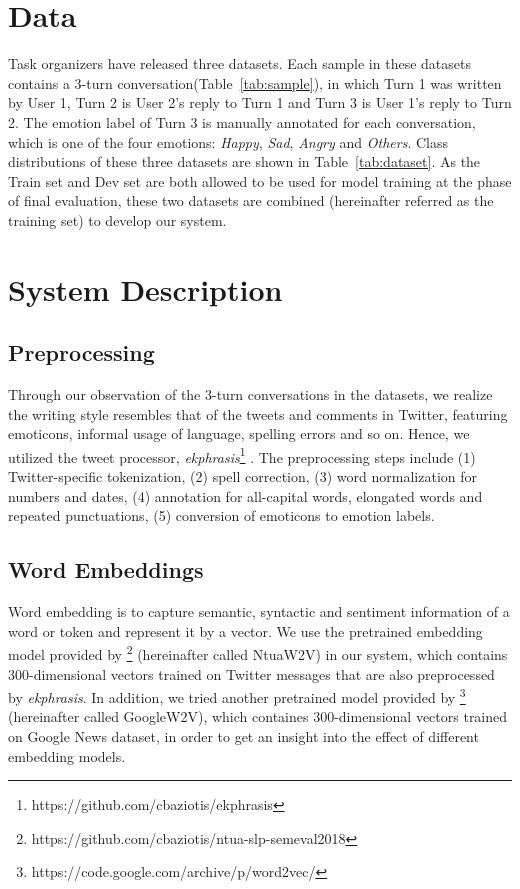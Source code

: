 \documentclass[11pt,a4paper]{article}
\begin{document}
\section{Data}
\label{sec:data}

Task organizers have released three datasets. Each sample in these datasets contains a 3-turn conversation(Table~\ref{tab:sample}), in which Turn 1 was written by User 1, Turn 2 is User 2's reply to Turn 1 and Turn 3 is User 1's reply to Turn 2. The emotion label of Turn 3 is manually annotated for each conversation, which is one of the four emotions: {\em Happy}, {\em Sad}, {\em Angry} and {\em Others}. Class distributions of these three datasets are shown in Table~\ref{tab:dataset}. As the Train set and Dev set are both allowed to be used for model training at the phase of final evaluation, these two datasets are combined (hereinafter referred as the training set) to develop our system.

\section{System Description}
\label{sec:system_desc}

\subsection{Preprocessing}

Through our observation of the 3-turn conversations in the datasets, we realize the writing style resembles that of the tweets and comments in Twitter, featuring emoticons, informal usage of language, spelling errors and so on. Hence, we utilized the tweet processor, {\em ekphrasis}\footnote{https://github.com/cbaziotis/ekphrasis} \cite{Baziotis2017SE1704}. The preprocessing steps include (1) Twitter-specific tokenization, (2) spell correction, (3) word normalization for numbers and dates, (4) annotation for all-capital words, elongated words and repeated punctuations, (5) conversion of emoticons to emotion labels.

\subsection{Word Embeddings}
\label{ssec:word_emb}

Word embedding is to capture semantic, syntactic and sentiment information of a word or token and represent it by a vector. We use the pretrained embedding model provided by \citet{Baziotis2018SE1803} \footnote{https://github.com/cbaziotis/ntua-slp-semeval2018} (hereinafter called NtuaW2V) in our system, which contains 300-dimensional vectors trained on Twitter messages that are also preprocessed by {\em ekphrasis}. In addition, we tried another pretrained model provided by \citet{Mikolov2013Distributed} \footnote{https://code.google.com/archive/p/word2vec/} (hereinafter called GoogleW2V), which containes 300-dimensional vectors trained on Google News dataset, in order to get an insight into the effect of different embedding models.
\end{document}
